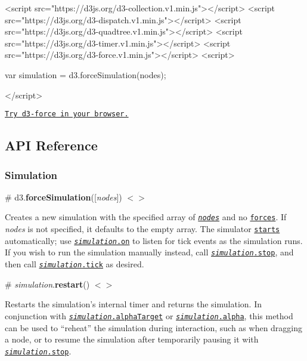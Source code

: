 \begin{DoxyCode}
<script src="https://d3js.org/d3-collection.v1.min.js"></script>
<script src="https://d3js.org/d3-dispatch.v1.min.js"></script>
<script src="https://d3js.org/d3-quadtree.v1.min.js"></script>
<script src="https://d3js.org/d3-timer.v1.min.js"></script>
<script src="https://d3js.org/d3-force.v1.min.js"></script>
<script>

var simulation = d3.forceSimulation(nodes);

</script>
\end{DoxyCode}


\href{https://tonicdev.com/npm/d3-force}{\tt Try d3-\/force in your browser.}

\subsection*{A\+PI Reference}

\subsubsection*{Simulation}

\label{_forceSimulation}%
\# d3.{\bfseries force\+Simulation}(\mbox{[}{\itshape nodes}\mbox{]}) \href{https://github.com/d3/d3-force/blob/master/src/simulation.js}{\tt $<$$>$}

Creates a new simulation with the specified array of \href{#simulation_nodes}{\tt {\itshape nodes}} and no \href{#simulation_force}{\tt forces}. If {\itshape nodes} is not specified, it defaults to the empty array. The simulator \href{#simulation_restart}{\tt starts} automatically; use \href{#simulation_on}{\tt {\itshape simulation}.on} to listen for tick events as the simulation runs. If you wish to run the simulation manually instead, call \href{#simulation_stop}{\tt {\itshape simulation}.stop}, and then call \href{#simulation_tick}{\tt {\itshape simulation}.tick} as desired.

\label{_simulation_restart}%
\# {\itshape simulation}.{\bfseries restart}() \href{https://github.com/d3/d3-force/blob/master/src/simulation.js#L80}{\tt $<$$>$}

Restarts the simulation’s internal timer and returns the simulation. In conjunction with \href{#simulation_alphaTarget}{\tt {\itshape simulation}.alpha\+Target} or \href{#simulation_alpha}{\tt {\itshape simulation}.alpha}, this method can be used to “reheat” the simulation during interaction, such as when dragging a node, or to resume the simulation after temporarily pausing it with \href{#simulation_stop}{\tt {\itshape simulation}.stop}.

